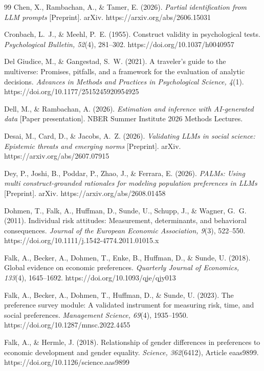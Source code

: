 \documentclass[10pt,letterpaper]{article}
\begin{document}
\begin{thebibliography}{99}
 Chen, X., Rambachan, A., \& Tamer, E. (2026). \textit{Partial identification from LLM prompts} [Preprint]. arXiv. https://arxiv.org/abs/2606.15031

 Cronbach, L.~J., \& Meehl, P.~E. (1955). Construct validity in psychological tests. \textit{Psychological Bulletin, 52}(4), 281--302. https://doi.org/10.1037/h0040957

 Del Giudice, M., \& Gangestad, S.~W. (2021). A traveler's guide to the multiverse: Promises, pitfalls, and a framework for the evaluation of analytic decisions. \textit{Advances in Methods and Practices in Psychological Science, 4}(1). https://doi.org/10.1177/2515245920954925

 Dell, M., \& Rambachan, A. (2026). \textit{Estimation and inference with AI-generated data} [Paper presentation]. NBER Summer Institute 2026 Methods Lectures.

 Desai, M., Card, D., \& Jacobs, A.~Z. (2026). \textit{Validating LLMs in social science: Epistemic threats and emerging norms} [Preprint]. arXiv. https://arxiv.org/abs/2607.07915

 Dey, P., Joshi, B., Poddar, P., Zhao, J., \& Ferrara, E. (2026). \textit{PALMs: Using multi construct-grounded rationales for modeling population preferences in LLMs} [Preprint]. arXiv. https://arxiv.org/abs/2608.01458

 Dohmen, T., Falk, A., Huffman, D., Sunde, U., Schupp, J., \& Wagner, G.~G. (2011). Individual risk attitudes: Measurement, determinants, and behavioral consequences. \textit{Journal of the European Economic Association, 9}(3), 522--550. https://doi.org/10.1111/j.1542-4774.2011.01015.x

 Falk, A., Becker, A., Dohmen, T., Enke, B., Huffman, D., \& Sunde, U. (2018). Global evidence on economic preferences. \textit{Quarterly Journal of Economics, 133}(4), 1645--1692. https://doi.org/10.1093/qje/qjy013

 Falk, A., Becker, A., Dohmen, T., Huffman, D., \& Sunde, U. (2023). The preference survey module: A validated instrument for measuring risk, time, and social preferences. \textit{Management Science, 69}(4), 1935--1950. https://doi.org/10.1287/mnsc.2022.4455

 Falk, A., \& Hermle, J. (2018). Relationship of gender differences in preferences to economic development and gender equality. \textit{Science, 362}(6412), Article eaas9899. https://doi.org/10.1126/science.aas9899


\end{thebibliography}
\end{document}
